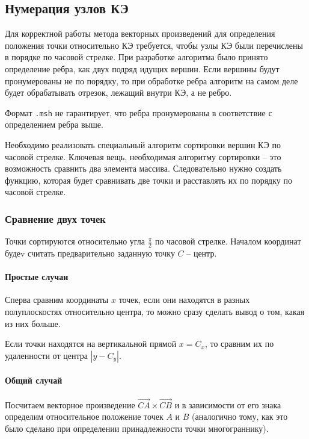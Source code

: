 \subsection{Нумерация узлов КЭ}
Для корректной работы метода векторных произведений для определения положения точки относительно КЭ требуется, чтобы узлы КЭ были перечислены в порядке по часовой стрелке. При разработке алгоритма было принято определение ребра, как двух подряд идущих вершин. Если вершины будут пронумерованы не по порядку, то при обработке ребра алгоритм на самом деле будет обрабатывать отрезок, лежащий внутри КЭ, а не ребро.

Формат \verb|.msh| не гарантирует, что ребра пронумерованы в соответствие с определением ребра выше. 

Необходимо реализовать специальный алгоритм сортировки вершин КЭ по часовой стрелке. Ключевая вещь, необходимая алгоритму сортировки -- это возможность сравнить два элемента массива. Следовательно нужно создать функцию, которая будет сравнивать две точки и расставлять их по порядку по часовой стрелке.

\subsubsection{Сравнение двух точек}

Точки сортируются относительно угла $\frac{\pi}{2}$ по часовой стрелке. Началом координат будеv считать предварительно заданную точку $C$ -- центр. 

\paragraph{Простые случаи}
Сперва сравним координаты $x$ точек, если они находятся в разных полуплоскостях относительно центра, то можно сразу сделать вывод о том, какая из них больше.

Если точки находятся на вертикальной прямой $x=C_x$, то сравним их по удаленности от центра $|y-C_y|$.

\paragraph{Общий случай}
Посчитаем векторное произведение $\vec{CA}\times\vec{CB}$ и в зависимости от его знака определим относительное положение точек $A$ и $B$ (аналогично тому, как это было сделано при определении принадлежности точки многограннику).

